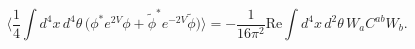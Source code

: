 \begin{equation}\label{Konishi_Anomaly}
\Big\langle \frac{1}{4}\int d^4x\,d^4\theta\,\Big(\phi^* e^{2V}\phi
+ \tilde\phi^* e^{-2V}\tilde\phi\Big)\Big\rangle
= -\frac{1}{16\pi^2} \mbox{Re}\int d^4x\,d^2\theta\,W_a C^{ab} W_b.
\end{equation}

